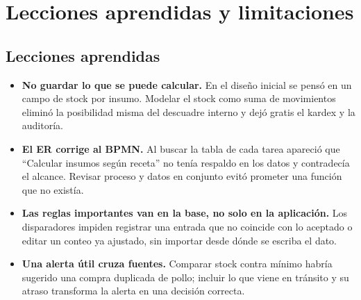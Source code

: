 \documentclass[11pt,letterpaper]{article}
\begin{document}
\section{Lecciones aprendidas y limitaciones}
\label{sec:lecciones}

\subsection{Lecciones aprendidas}
\begin{itemize}[leftmargin=*,itemsep=2pt]
  \item \textbf{No guardar lo que se puede calcular.} En el diseño inicial se pensó en un campo de stock por insumo. Modelar el stock como suma de movimientos eliminó la posibilidad misma del descuadre interno y dejó gratis el kardex y la auditoría.
  \item \textbf{El ER corrige al BPMN.} Al buscar la tabla de cada tarea apareció que ``Calcular insumos según receta'' no tenía respaldo en los datos y contradecía el alcance. Revisar proceso y datos en conjunto evitó prometer una función que no existía.
  \item \textbf{Las reglas importantes van en la base, no solo en la aplicación.} Los disparadores impiden registrar una entrada que no coincide con lo aceptado o editar un conteo ya ajustado, sin importar desde dónde se escriba el dato.
  \item \textbf{Una alerta útil cruza fuentes.} Comparar stock contra mínimo habría sugerido una compra duplicada de pollo; incluir lo que viene en tránsito y su atraso transforma la alerta en una decisión correcta.
\end{itemize}
\end{document}
